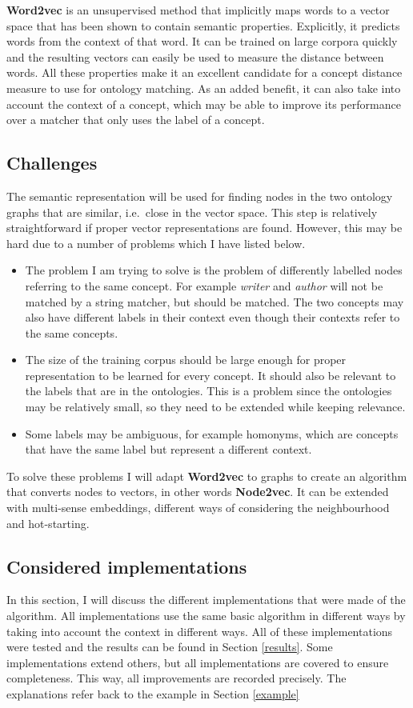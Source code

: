 \documentclass{article}
\begin{document}
 \textbf{Word2vec} is an unsupervised method that implicitly maps words to a vector space that has been shown to contain semantic properties. Explicitly, it predicts words from the context of that word. %
 It can be trained on large corpora quickly and the resulting vectors can easily be used to measure the distance between words. All these properties make it an excellent candidate for a concept distance measure to use for ontology matching. As an added benefit, it can also take into account the context of a concept, which may be able to improve its performance over a matcher that only uses the label of a concept. 
 
 \subsection{Challenges}
 The semantic representation will be used for finding nodes in the two ontology graphs that are similar, i.e.\ close in the vector space. This step is relatively straightforward if proper vector representations are found. However, this may be hard due to a number of problems which I have listed below.

 \begin{itemize}
  \item The problem I am trying to solve is the problem of differently labelled nodes referring to the same concept. For example \emph{writer} and \emph{author} will not be matched by a string matcher, but should be matched. The two concepts may also have different labels in their context even though their contexts refer to the same concepts.
  \item The size of the training corpus should be large enough for proper representation to be learned for every concept. It should also be relevant to the labels that are in the ontologies. This is a problem since the ontologies may be relatively small, so they need to be extended while keeping relevance.
  \item Some labels may be ambiguous, for example homonyms, which are concepts that have the same label but represent a different context.
 \end{itemize}
 
 To solve these problems I will adapt \textbf{Word2vec} to graphs to create an algorithm that converts nodes to vectors, in other words \textbf{Node2vec}. It can be extended with multi-sense embeddings, different ways of considering the neighbourhood and hot-starting.
 
 \subsection{Considered implementations}
 In this section, I will discuss the different implementations that were made of the algorithm. All implementations use the same basic algorithm in different ways by taking into account the context in different ways. All of these implementations were tested and the results can be found in Section \ref{results}. Some implementations extend others, but all implementations are covered to ensure completeness. This way, all improvements are recorded precisely.
 The explanations refer back to the example in Section \ref{example}
\end{document}
